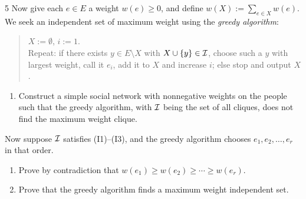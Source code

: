 \begin{exercise}{5}
    Now give each $e\in E$ a weight $w(e)\ge0$, and define
    $w(X):=\sum_{e\in X}w(e)$. We seek an independent set of maximum weight
    using the \emph{greedy algorithm}:
    \begin{quote}
        $X:=\emptyset$, $i:=1$.\\
        Repeat: if there exists $y\in E\setminus X$ with $X\cup\{y\}\in\mathcal{I}$, choose
        such a $y$ with largest weight, call it $e_i$, add it to $X$ and increase
        $i$; else stop and output $X$.
    \end{quote}
    \begin{enumerate}[label=(\alph*),start=4]
        \item Construct a simple social network with nonnegative weights on the
              people such that the greedy algorithm, with $\mathcal{I}$ being the set of
              all cliques, does not find the maximum weight clique.
    \end{enumerate}
    Now suppose $\mathcal{I}$ satisfies (I1)--(I3), and the greedy algorithm chooses
    $e_1,e_2,\dots,e_r$ in that order.
    \begin{enumerate}[label=(\alph*),start=5]
        \item Prove by contradiction that
              $w(e_1)\ge w(e_2)\ge\cdots\ge w(e_r)$.
        \item Prove that the greedy algorithm finds a maximum weight independent
              set.
    \end{enumerate}
\end{exercise}
